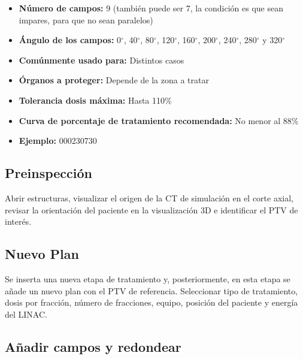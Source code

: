 \documentclass{article}
\begin{document}
\begin{center}
    \begin{tcolorbox}[colback=gray!25!white, colframe=gray, title=\textbf{Resumen}, width=0.8\linewidth, center title]
        \begin{itemize}
            \item \textbf{Número de campos:} 9 (también puede ser 7, la condición es que sean impares, para que no sean paralelos)
            \item \textbf{Ángulo de los campos:} 0$^{\circ}$, 40$^{\circ}$, 80$^{\circ}$, 120$^{\circ}$, 160$^{\circ}$, 200$^{\circ}$, 240$^{\circ}$, 280$^{\circ}$ y 320$^{\circ}$
            \item \textbf{Comúnmente usado para:} Distintos casos
            \item \textbf{Órganos a proteger:} Depende de la zona a tratar
            \item \textbf{Tolerancia dosis máxima:} Hasta 110\%
            \item \textbf{Curva de porcentaje de tratamiento recomendada:} No menor al 88\%
            \item \textbf{Ejemplo:} 000230730
        \end{itemize}
    \end{tcolorbox}
\end{center}

\subsection{Preinspección}

Abrir estructuras, visualizar el origen de la CT de simulación en el corte axial, revisar la orientación del paciente en la visualización 3D e identificar el PTV de interés.

\subsection{Nuevo Plan}

Se inserta una nueva etapa de tratamiento y, posteriormente, en esta etapa se añade un nuevo plan con el PTV de referencia. Seleccionar tipo de tratamiento, dosis por fracción, número de fracciones, equipo, posición del paciente y energía del LINAC.

\subsection{Añadir campos y redondear}
\end{document}
